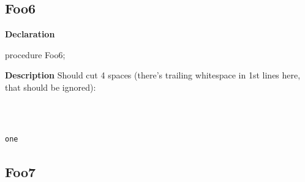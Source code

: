 \documentclass{report}
\newif\ifpdf
\begin{document}
\subsection*{Foo6}
\fi
\label{ok_longcode_indentation-Foo6}
\begin{list}{}{
\setlength{\itemindent}{0cm}
\setlength{\listparindent}{0cm}
\setlength{\leftmargin}{\evensidemargin}
\addtolength{\leftmargin}{\tmplength}
\settowidth{\labelsep}{X}
\addtolength{\leftmargin}{\labelsep}
\setlength{\labelwidth}{\tmplength}
}
\item[\textbf{Declaration}\hfill]
\ifpdf
\begin{flushleft}
\fi
\begin{ttfamily}
procedure Foo6;\end{ttfamily}

\ifpdf
\end{flushleft}
\fi

\par
\item[\textbf{Description}]
Should cut 4 spaces (there's trailing whitespace in 1st lines here, that should be ignored):

\texttt{\\\nopagebreak[3]
~~~~~~~~~~~~~~~~~\\\nopagebreak[3]
~~~~~~~~~~~~~~~~~~\\\nopagebreak[3]
one\\
}

\end{list}
\ifpdf
\subsection*{\large{\textbf{Foo7}}\normalsize\hspace{1ex}\hrulefill}
\else
\end{document}
